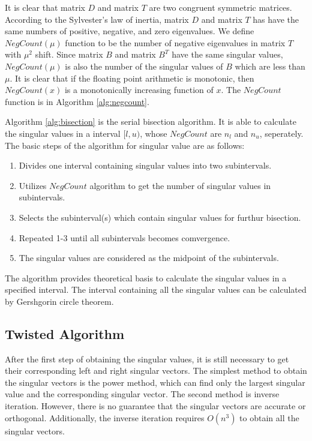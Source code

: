 It is clear that matrix $D$ and matrix $T$ are two congruent symmetric matrices.
According to the Sylvester's law of inertia, matrix $D$ and matrix $T$ has have the same numbers of positive, negative, and zero eigenvalues.
We define $NegCount(\mu)$ function to be the number of negative eigenvalues in matrix $T$ with $\mu^2$ shift.
Since matrix $B$ and matrix $B^T$ have the same singular values,
$NegCount(\mu)$ is also the number of the singular values of $B$ which are less than $\mu$.
It is clear that if the floating point arithmetic is monotonic, then $NegCount(x)$ is a monotonically increasing function of $x$\cite{95ETNAbisecion}.
The $NegCount$ function is in Algorithm \ref{alg:negcount}.




Algorithm \ref{alg:bisection} is the serial bisection algorithm.
It is able to calculate the singular values in a interval $[l,u)$, whose $NegCount$ are $n_l$ and $n_u$, seperately.
The basic steps of the algorithm for singular value are as follows:
\begin{enumerate}
\item Divides one interval containing singular values into two subintervals.
\item Utilizes $NegCount$ algorithm to get the number of singular values in subintervals.
\item Selects the subinterval(s) which contain singular values for furthur bisection.
\item Repeated 1-3 until all subintervals becomes comvergence.%
\item The singular values are considered as the midpoint of the subintervals.
\end{enumerate}

The algorithm provides theoretical basis to calculate the singular values in a specified interval.
The interval containing all the singular values can be calculated by Gershgorin circle theorem.

\subsection{Twisted Algorithm}
After the first step of obtaining the singular values, it is still necessary to get their corresponding left and right singular vectors.
The simplest method to obtain the singular vectors is the power method, which can find only the largest singular value and the corresponding singular vector\cite{97bookalgebra}.
The second method is inverse iteration.
However, there is no guarantee that the singular vectors are accurate or orthogonal.
Additionally, the inverse iteration requires $O(n^3)$ to obtain all the singular vectors.


